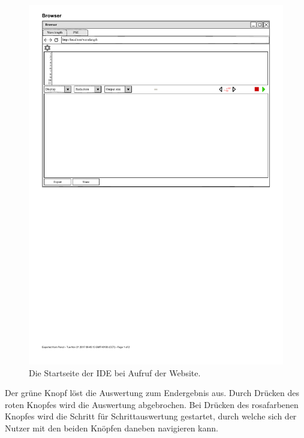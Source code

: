 \documentclass[parskip=full,11pt,twoside]{scrartcl}
\begin{document}
\begin{figure}[H]
	\centering
	\includegraphics[width = \textwidth]{img/startseite}
	\caption{Die Startseite der IDE bei Aufruf der Website.} 
	\label{img:start}
\end{figure}


Der grüne Knopf löst die Auswertung zum Endergebnis aus. Durch Drücken des roten Knopfes wird die Auswertung abgebrochen. Bei Drücken des rosafarbenen Knopfes wird die Schritt für Schrittauswertung gestartet, durch welche sich der Nutzer mit den beiden Knöpfen daneben navigieren kann.
\end{document}
